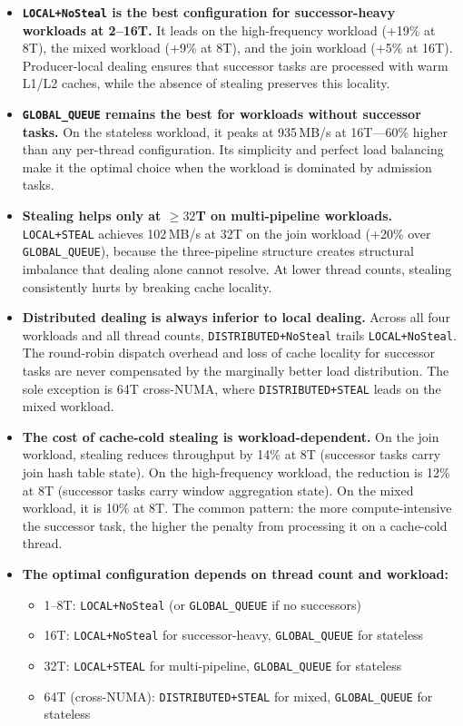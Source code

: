 \begin{itemize}
    \item \textbf{\texttt{LOCAL+NoSteal} is the best configuration for successor-heavy workloads at 2--16T.}
    It leads on the high-frequency workload (+19\% at 8T), the mixed workload (+9\% at 8T), and the join workload (+5\% at 16T).
    Producer-local dealing ensures that successor tasks are processed with warm L1/L2 caches, while the absence of stealing preserves this locality.

    \item \textbf{\texttt{GLOBAL\_QUEUE} remains the best for workloads without successor tasks.}
    On the stateless workload, it peaks at 935\,MB/s at 16T---60\% higher than any per-thread configuration.
    Its simplicity and perfect load balancing make it the optimal choice when the workload is dominated by admission tasks.

    \item \textbf{Stealing helps only at $\geq 32$T on multi-pipeline workloads.}
    \texttt{LOCAL+STEAL} achieves 102\,MB/s at 32T on the join workload (+20\% over \texttt{GLOBAL\_QUEUE}), because the three-pipeline structure creates structural imbalance that dealing alone cannot resolve.
    At lower thread counts, stealing consistently hurts by breaking cache locality.

    \item \textbf{Distributed dealing is always inferior to local dealing.}
    Across all four workloads and all thread counts, \texttt{DISTRIBUTED+NoSteal} trails \texttt{LOCAL+NoSteal}.
    The round-robin dispatch overhead and loss of cache locality for successor tasks are never compensated by the marginally better load distribution.
    The sole exception is 64T cross-NUMA, where \texttt{DISTRIBUTED+STEAL} leads on the mixed workload.

    \item \textbf{The cost of cache-cold stealing is workload-dependent.}
    On the join workload, stealing reduces throughput by 14\% at 8T (successor tasks carry join hash table state).
    On the high-frequency workload, the reduction is 12\% at 8T (successor tasks carry window aggregation state).
    On the mixed workload, it is 10\% at 8T.
    The common pattern: the more compute-intensive the successor task, the higher the penalty from processing it on a cache-cold thread.

    \item \textbf{The optimal configuration depends on thread count and workload:}
    \begin{itemize}
        \item 1--8T: \texttt{LOCAL+NoSteal} (or \texttt{GLOBAL\_QUEUE} if no successors)
        \item 16T: \texttt{LOCAL+NoSteal} for successor-heavy, \texttt{GLOBAL\_QUEUE} for stateless
        \item 32T: \texttt{LOCAL+STEAL} for multi-pipeline, \texttt{GLOBAL\_QUEUE} for stateless
        \item 64T (cross-NUMA): \texttt{DISTRIBUTED+STEAL} for mixed, \texttt{GLOBAL\_QUEUE} for stateless
    \end{itemize}
\end{itemize}
